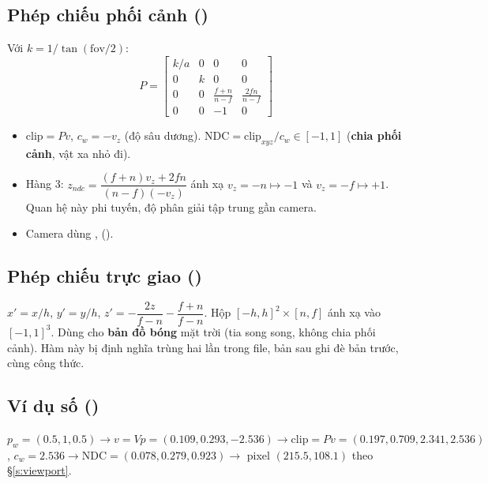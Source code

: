 \subsection{Phép chiếu phối cảnh ()}
Với $k=1/\tan(\mathrm{fov}/2)$:
\[
P=\begin{bmatrix}k/a&0&0&0\\0&k&0&0\\0&0&\frac{f+n}{n-f}&\frac{2fn}{n-f}\\0&0&-1&0\end{bmatrix}
\]
\begin{itemize}
\item $\mathrm{clip}=Pv$, $c_w=-v_z$ (độ sâu dương). $\mathrm{NDC}=\mathrm{clip}_{xyz}/c_w\in[-1,1]$ (\textbf{chia phối cảnh}, vật xa nhỏ đi).
\item Hàng 3: $z_{ndc}=\dfrac{(f+n)v_z+2fn}{(n-f)(-v_z)}$ ánh xạ $v_z=-n\mapsto-1$ và $v_z=-f\mapsto+1$. Quan hệ này phi tuyến, độ phân giải tập trung gần camera.
\item Camera dùng ,  ().
\end{itemize}

\subsection{Phép chiếu trực giao ()}
$x'=x/h$, $y'=y/h$, $z'=-\dfrac{2z}{f-n}-\dfrac{f+n}{f-n}$. Hộp $[-h,h]^2\times[n,f]$ ánh xạ vào $[-1,1]^3$. Dùng cho \textbf{bản đồ bóng} mặt trời (tia song song, không chia phối cảnh). Hàm này bị định nghĩa trùng hai lần trong file, bản sau ghi đè bản trước, cùng công thức.

\subsection{Ví dụ số ()}
$p_w=(0.5,1,0.5)\to v=Vp=(0.109,0.293,-2.536)\to \mathrm{clip}=Pv=(0.197,0.709,2.341,2.536)$, $c_w=2.536\to\mathrm{NDC}=(0.078,0.279,0.923)\to$ pixel $(215.5,108.1)$ theo \S\ref{s:viewport}.


